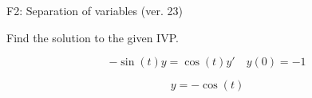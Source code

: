 \begin{exercise}
  \begin{exerciseTitle}F2: Separation of variables (ver. 23)\end{exerciseTitle}
  \begin{exerciseStatement}
    
Find the solution to the given IVP.

    
\[-\sin\left(t\right) y= \cos\left(t\right) y'\hspace{1em} y\left( 0 \right)= -1\]

  \end{exerciseStatement}
  \begin{exerciseAnswer}
    
\[y= -\cos\left(t\right)\]

  \end{exerciseAnswer}
\end{exercise}